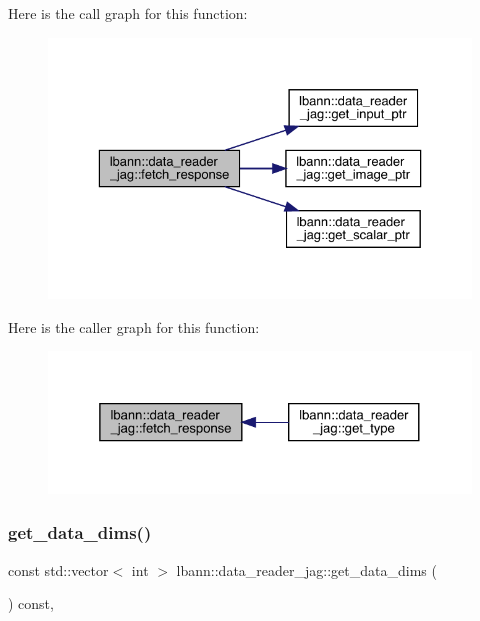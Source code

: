 Here is the call graph for this function\+:\nopagebreak
\begin{figure}[H]
\begin{center}
\leavevmode
\includegraphics[width=329pt]{classlbann_1_1data__reader__jag_ad9b4259f23a9744ec1c86c688a67f583_cgraph}
\end{center}
\end{figure}
Here is the caller graph for this function\+:\nopagebreak
\begin{figure}[H]
\begin{center}
\leavevmode
\includegraphics[width=325pt]{classlbann_1_1data__reader__jag_ad9b4259f23a9744ec1c86c688a67f583_icgraph}
\end{center}
\end{figure}
\mbox{\label{classlbann_1_1data__reader__jag_af724f9e38e98e9a4d46f18e7ccadcbb3}} 
\subsubsection{\texorpdfstring{get\+\_\+data\+\_\+dims()}{get\_data\_dims()}}
{\footnotesize\ttfamily const std\+::vector$<$ int $>$ lbann\+::data\+\_\+reader\+\_\+jag\+::get\+\_\+data\+\_\+dims (\begin{DoxyParamCaption}{ }\end{DoxyParamCaption}) const\hspace{0.3cm}{\ttfamily [override]}, {\ttfamily [virtual]}}



